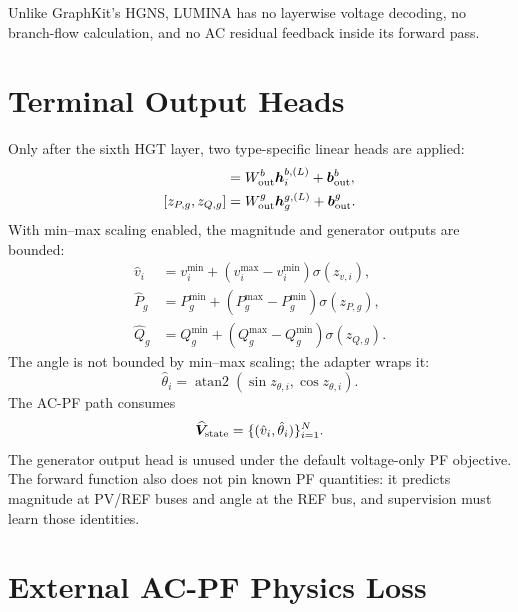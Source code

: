\documentclass[10pt]{article}
\begin{document}
Unlike GraphKit's HGNS, LUMINA has no layerwise voltage decoding, no branch-flow
calculation, and no AC residual feedback inside its forward pass.

\section{Terminal Output Heads}

Only after the sixth HGT layer, two type-specific linear heads are applied:
\begin{align}
 [z_{\theta,i},z_{v,i}]&=W_{\rm out}^{b}\bm h_i^{b,(L)}+\bm b_{\rm out}^{b},\\
 [z_{P,g},z_{Q,g}]&=W_{\rm out}^{g}\bm h_g^{g,(L)}+\bm b_{\rm out}^{g}.
\end{align}
With min--max scaling enabled, the magnitude and generator outputs are bounded:
\begin{align}
 \hat v_i&=v_i^{\min}+(v_i^{\max}-v_i^{\min})\sigma(z_{v,i}),\\
 \hat P_g&=P_g^{\min}+(P_g^{\max}-P_g^{\min})\sigma(z_{P,g}),\\
 \hat Q_g&=Q_g^{\min}+(Q_g^{\max}-Q_g^{\min})\sigma(z_{Q,g}).
\end{align}
The angle is not bounded by min--max scaling; the adapter wraps it:
\begin{equation}
 \hat\theta_i=\operatorname{atan2}(\sin z_{\theta,i},\cos z_{\theta,i}).
\end{equation}
The AC-PF path consumes
\begin{equation}
 \widehat{\bm V}_{\rm state}=\{(\hat v_i,\hat\theta_i)\}_{i=1}^{N}.
\end{equation}
The generator output head is unused under the default voltage-only PF objective.
The forward function also does not pin known PF quantities: it predicts
magnitude at PV/REF buses and angle at the REF bus, and supervision must learn
those identities.

\section{External AC-PF Physics Loss}
\end{document}
